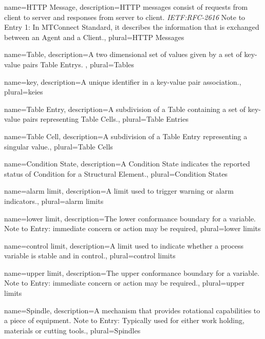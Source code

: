 {
    name={HTTP Message},
	description={HTTP messages consist of requests from client to server and responses from server to client. \textit{IETF:RFC-2616}
Note to Entry 1: In MTConnect Standard, it describes the information that is exchanged between an \gls{Agent} and a \gls{Client}.},
	plural={HTTP Messages}
}

{
    name={Table},
	description={A two dimensional set of values given by a set of \glspl{key-value pair} \glspl{Table Entry}. },
	plural={Tables}
}

{
    name={key},
	description={A unique identifier in a \gls{key-value pair} association.},
	plural={keies}
}

{
    name={Table Entry},
	description={A subdivision of a \gls{Table} containing a set of \glspl{key-value pair} representing \glspl{Table Cell}.},
	plural={Table Entries}
}

{
    name={Table Cell},
	description={A subdivision of a \gls{Table Entry} representing a singular value.},
	plural={Table Cells}
}

{
    name={Condition State},
	description={A \gls{Condition State} indicates the reported status of \gls{Condition} for a \gls{Structural Element}.},
	plural={Condition States}
}

{
    name={alarm limit},
	description={A limit used to trigger warning or alarm indicators.},
	plural={alarm limits}
}

{
    name={lower limit},
	description={The lower conformance boundary for a variable.
Note to Entry: immediate concern or action may be required},
	plural={lower limits}
}

{
    name={control limit},
	description={A limit used to indicate whether a process variable is stable and in control.},
	plural={control limits}
}

{
    name={upper limit},
	description={The upper conformance boundary for a variable.
Note to Entry: immediate concern or action may be required.},
	plural={upper limits}
}

{
    name={Spindle},
	description={A mechanism that provides rotational capabilities to a piece of equipment. 
Note to Entry: Typically used for either work holding, materials or cutting tools.},
	plural={Spindles}
}

